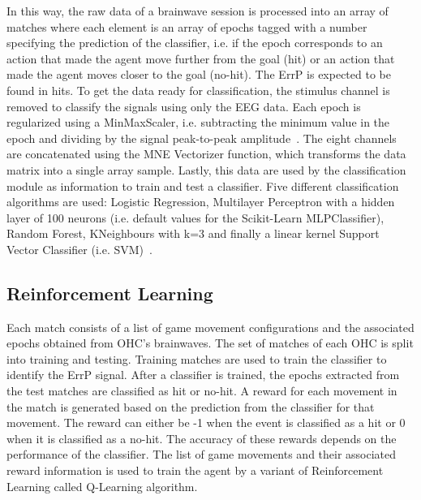 \documentclass[journal]{IEEEtran}
\begin{document}
{In this way, the raw data of a brainwave session is processed into an array of matches where each element is an array of epochs tagged with a number specifying the prediction of the classifier, i.e. if the epoch corresponds to an action that made the agent move further from the goal (hit) or an action that made the agent moves closer to the goal (no-hit). The ErrP is expected to be found in hits. To get the data ready for classification, the stimulus channel is removed to classify the signals using only the EEG data. Each epoch is regularized using a MinMaxScaler, i.e. subtracting the minimum value in the epoch and dividing by the signal peak-to-peak amplitude~\cite{Zhou2019}.  The eight channels are concatenated using the MNE Vectorizer function, which transforms the data matrix into a single array sample. Lastly, this data are used by the classification module as information to train and test a classifier. Five different classification algorithms are used:  Logistic Regression, Multilayer Perceptron with a hidden layer of 100 neurons (i.e. default values for the Scikit-Learn MLPClassifier), Random Forest, KNeighbours with k=3 and finally a linear kernel Support Vector Classifier (i.e. SVM)~\cite{Lotte2018}.




\subsection{Reinforcement Learning}
\label{learning}

Each match consists of a list of game movement configurations and the associated epochs obtained from OHC's brainwaves.  The set of matches of each OHC is split into training and testing.  Training matches are used to train the classifier to identify the ErrP signal.  After a classifier is trained, the epochs extracted from the test matches are classified as hit or no-hit.  A reward for each movement in the match is generated based on the prediction from the classifier for that movement.  The reward can either be -1 when the event is classified as a hit or 0 when it is classified as a no-hit. The accuracy of these rewards depends on the performance of the classifier. The list of game movements and their associated reward information is used to train the agent by a variant of Reinforcement Learning called Q-Learning algorithm.

}
\end{document}
